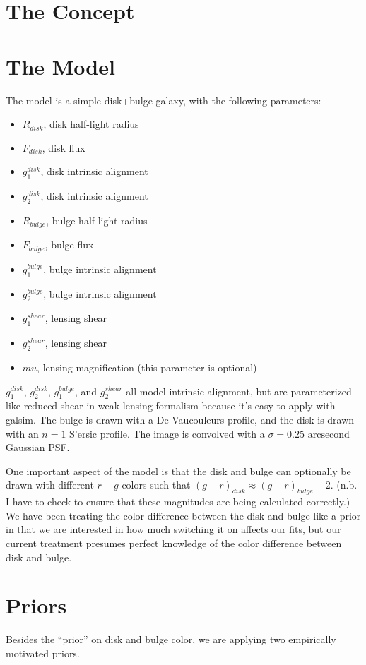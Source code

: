 \documentclass{article}
\begin{document}
\section{The Concept}
 

\section{The Model}
The model is a simple disk+bulge galaxy, with the following parameters:
\begin{itemize}
\item $R_{disk}$, disk half-light radius
\item $F_{disk}$, disk flux
\item $g_1^{disk}$, disk intrinsic alignment
\item $g_2^{disk}$, disk intrinsic alignment
\item $R_{bulge}$, bulge half-light radius
\item $F_{bulge}$, bulge flux
\item $g_1^{bulge}$, bulge intrinsic alignment
\item $g_2^{bulge}$, bulge intrinsic alignment
\item $g_1^{shear}$, lensing shear
\item $g_2^{shear}$, lensing shear
\item $mu$, lensing magnification (this parameter is optional)
\end{itemize}
$g_1^{disk}$, $g_2^{disk}$, $g_1^{bulge}$, and $g_2^{shear}$ all model
intrinsic alignment, but are parameterized like reduced shear in weak
lensing formalism because it's easy to apply with galsim.  The bulge
is drawn with a De Vaucouleurs profile, and the disk is drawn with an
$n=1$ S'{e}rsic profile.  The image is convolved with a $\sigma = 0.25
\textrm{ arcsecond}$ Gaussian PSF.

One important aspect of the model is that the disk and bulge can
optionally be drawn with different $r-g$ colors such that
$(g-r)_{disk} \approx (g-r)_{bulge} - 2$. (n.b. I have to check to
ensure that these magnitudes are being calculated correctly.)  We have
been treating the color difference between the disk and bulge like a
prior in that we are interested in how much switching it on affects
our fits, but our current treatment presumes perfect knowledge of the
color difference between disk and bulge.


\section{Priors}
Besides the ``prior'' on disk and bulge color, we are applying two 
empirically motivated priors.
\end{document}

